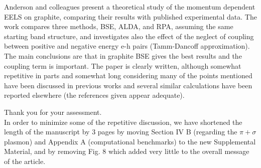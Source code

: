 \documentclass[aps,prb,10pt,endfloats]{revtex4-1}
\begin{document}
Anderson and colleagues present a theoretical study of the momentum dependent
EELS on graphite, comparing their results with published experimental data. The
work compares three methods, BSE, ALDA, and RPA, assuming the same starting band
structure, and investigates also the effect of the neglect of coupling between
positive and negative energy e-h pairs (Tamm-Dancoff approximation). The main
conclusions are that in graphite BSE gives the best results and the coupling
term is important. The paper is clearly written, although somewhat repetitive in
parts and somewhat long considering many of the points mentioned have been
discussed in previous works and several similar calculations have been reported
elsewhere (the references given appear adequate).
\begin{shaded*}
Thank you for your assessment.\\

In order to minimize some of the repetitive discussion, we have shortened the
length of the manuscript by 3 pages by moving Section IV B (regarding the $\pi +
\sigma$ plasmon) and Appendix A (computational benchmarks) to the new
Supplemental Material, and by removing Fig. 8 which added very little to the
overall message of the article.
\end{shaded*}
\end{document}
